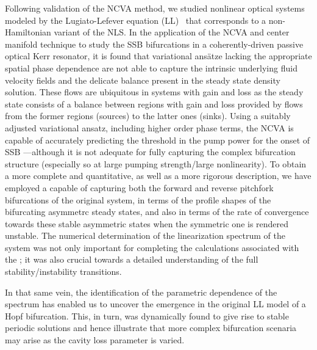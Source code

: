 Following validation of the NCVA method, we studied nonlinear optical systems modeled by the Lugiato-Lefever equation (LL)~\cite{LL} that corresponds to a non-Hamiltonian variant of the NLS.  In the application of the NCVA and center manifold technique to
study the SSB bifurcations in a 
coherently-driven passive optical Kerr resonator, it is found that variational ans\"atze lacking the appropriate 
spatial phase dependence are not able to capture the intrinsic underlying fluid
velocity fields and the delicate
balance present in the steady state density solution.
%
These flows are ubiquitous in systems with gain and loss as
the steady state consists of a balance between regions with
gain and loss provided by flows from the former regions (sources) 
to the latter ones (sinks).
%
Using a suitably adjusted variational ansatz, including higher order
phase terms, the NCVA is capable of accurately predicting the
threshold in the pump power for the onset of SSB
---although it is not adequate for fully capturing the complex
bifurcation structure (especially so at large pumping strength/large
nonlinearity). 
%
To obtain a more complete and quantitative, as well as a more rigorous description, 
we have employed a  
capable of capturing both the
forward and reverse pitchfork bifurcations of the
original system, in terms
of the profile shapes of the bifurcating asymmetrc steady states,
and also in terms of the rate of convergence towards these
stable asymmetric states when the symmetric one is rendered
unstable. The numerical determination of the linearization spectrum
of the system was not only important for completing the calculations
associated with the ; it was also crucial towards
a detailed understanding of the full stability/instability
transitions.

In that same vein, the identification of the parametric dependence of the spectrum has
enabled us to uncover the emergence in the original LL model of a Hopf bifurcation. This, in turn, 
was dynamically found to give rise to stable periodic solutions
and hence illustrate that more complex bifurcation scenaria may arise
as the cavity loss parameter is varied.

